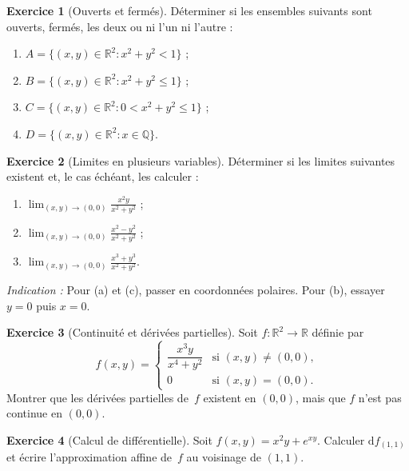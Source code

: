 \documentclass[12pt,a4paper,openany]{book}
\theoremstyle{definition}
\newtheorem{exercice}{Exercice}[chapter]
\newcommand{\Q}{\mathbb{Q}}
\newcommand{\R}{\mathbb{R}}
\newcommand{\dd}{\mathrm{d}}
\begin{document}
\begin{exercice}[Ouverts et fermés]
  \label{exo:ouverts-fermes}
  Déterminer si les ensembles suivants sont ouverts, fermés, les deux ou ni l'un ni l'autre :
  \begin{enumerate}[label=(\alph*)]
    \item $A = \{(x,y) \in \R^2 : x^2 + y^2 < 1\}$ ;
    \item $B = \{(x,y) \in \R^2 : x^2 + y^2 \leqslant 1\}$ ;
    \item $C = \{(x,y) \in \R^2 : 0 < x^2 + y^2 \leqslant 1\}$ ;
    \item $D = \{(x,y) \in \R^2 : x \in \Q\}$.
  \end{enumerate}
\end{exercice}

\begin{exercice}[Limites en plusieurs variables]
  \label{exo:limites}
  Déterminer si les limites suivantes existent et, le cas échéant, les calculer :
  \begin{enumerate}[label=(\alph*)]
    \item $\displaystyle \lim_{(x,y) \to (0,0)} \frac{x^2 y}{x^2 + y^2}$ ;
    \item $\displaystyle \lim_{(x,y) \to (0,0)} \frac{x^2 - y^2}{x^2 + y^2}$ ;
    \item $\displaystyle \lim_{(x,y) \to (0,0)} \frac{x^3 + y^3}{x^2 + y^2}$.
  \end{enumerate}
  \emph{Indication :} Pour (a) et (c), passer en coordonnées polaires. Pour (b), essayer $y = 0$ puis $x = 0$.
\end{exercice}

\begin{exercice}[Continuité et dérivées partielles]
  \label{exo:cont-partielles}
  Soit $f \colon \R^2 \to \R$ définie par
  \[
    f(x,y) = \begin{cases} \dfrac{x^3 y}{x^4 + y^2} & \text{si } (x,y) \neq (0,0), \\ 0 & \text{si } (x,y) = (0,0). \end{cases}
  \]
  Montrer que les dérivées partielles de~$f$ existent en $(0,0)$, mais que $f$ n'est pas continue en $(0,0)$.
\end{exercice}

\begin{exercice}[Calcul de différentielle]
  \label{exo:calcul-differentielle}
  Soit $f(x,y) = x^2 y + e^{xy}$. Calculer $\dd f_{(1,1)}$ et écrire l'approximation affine de~$f$ au voisinage de $(1,1)$.
\end{exercice}
\end{document}
